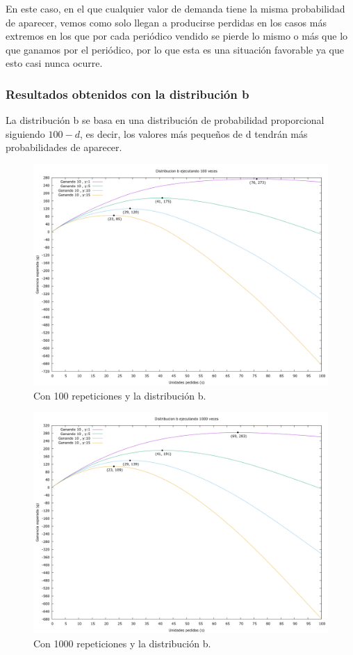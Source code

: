 \documentclass[12pt, spanish]{article}
\begin{document}
En este caso, en el que cualquier valor de demanda tiene la misma probabilidad de aparecer, vemos como solo llegan a producirse perdidas en los casos más extremos en los que por cada periódico vendido se pierde lo mismo o más que lo que ganamos por el periódico, por lo que esta es una situación favorable ya que esto casi nunca ocurre.


\subsubsection{Resultados obtenidos con la distribución b}

La distribución b se basa en una distribución de probabilidad proporcional siguiendo $100 - d$, es decir, los valores más pequeños de d tendrán más probabilidades de aparecer.

\begin{figure}[H]
	\centering
	\includegraphics[scale = 0.2]{prob_b/datos_b_100.png}
	\caption{Con 100 repeticiones y la distribución b.}
	\label{fig:ej1_a_100}

\end{figure}

\begin{figure}[H]
	\centering
	\includegraphics[scale = 0.2]{prob_b/datos_b_1000.png}
	\caption{Con 1000 repeticiones y la distribución b.}
	\label{fig:ej1_a_1000}

\end{figure}
\end{document}
